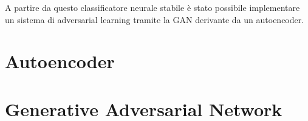 A partire da questo classificatore neurale stabile è stato possibile implementare un sistema di adversarial learning tramite la GAN derivante da un autoencoder. 

\section{Autoencoder}


\section{Generative Adversarial Network}
